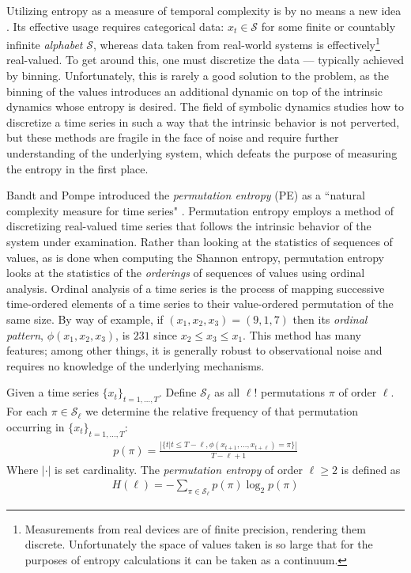 Utilizing entropy as a measure of temporal complexity is by no means a new idea \cite{Shannon1951, mantegna1994linguistic}. Its effective usage requires categorical data: $x_t \in \mathcal{S}$ for some finite or countably infinite \emph{alphabet} $\mathcal{S}$, whereas data taken from real-world systems is effectively\footnote{Measurements from real devices are of finite precision, rendering them discrete. Unfortunately the space of values taken is so large that for the purposes of entropy calculations it can be taken as a continuum.} real-valued.  To get around this, one must discretize the data --- typically achieved by binning.  Unfortunately, this is rarely a good solution to the problem, as the binning of the values introduces an additional dynamic on top of the intrinsic dynamics whose entropy is desired\cite{bollt2001}. The field of symbolic dynamics studies how to discretize a time series in such a way that the intrinsic behavior is not perverted, but these methods are fragile in the face of noise and require further understanding of the underlying system, which defeats the purpose of measuring the entropy in the first place.

Bandt and Pompe introduced the \emph{permutation entropy} (PE) as a ``natural
complexity measure for time series" \cite{bandt2002per}.  Permutation entropy
employs a method of discretizing real-valued time series that follows the
intrinsic behavior of the system under examination.  Rather than looking at the
statistics of sequences of values, as is done when computing the Shannon
entropy, permutation entropy looks at the statistics of the \emph{orderings} of
sequences of values using ordinal analysis. Ordinal analysis of a time series is
the process of mapping successive time-ordered elements of a time series to
their value-ordered permutation of the same size.  By way of example, if $(x_1,
x_2, x_3) = (9, 1, 7)$ then its \emph{ordinal pattern}, $\phi(x_1, x_2, x_3)$,
is $231$ since $x_2 \leq x_3 \leq x_1$.  This method has many features; among
other things, it is generally robust to observational noise and requires no
knowledge of the underlying mechanisms.

\begin{mydef}

  Given a time series $\{x_t\}_{t = 1,\dots,T}$. Define $\mathcal{S}_\ell$ as all $\ell!$ permutations $\pi$ of order $\ell$. For each $\pi \in \mathcal{S}_\ell$ we determine the relative frequency of that permutation occurring in $\{x_t\}_{t = 1,\dots,T}$:
  \begin{align*}
    p(\pi) = \frac{\left|\{t|t \leq T-\ell,\phi(x_{t+1},\dots,x_{t+\ell}) = \pi\}\right|}{T-\ell+1}
  \end{align*}
  Where $|\cdot|$ is set cardinality. The \emph{permutation entropy} of order $\ell \ge 2$ is defined as
  \begin{align*}
    H(\ell) = - \sum_{\pi \in \mathcal{S}_\ell} p(\pi) \log_2 p(\pi)
  \end{align*}

\end{mydef}

